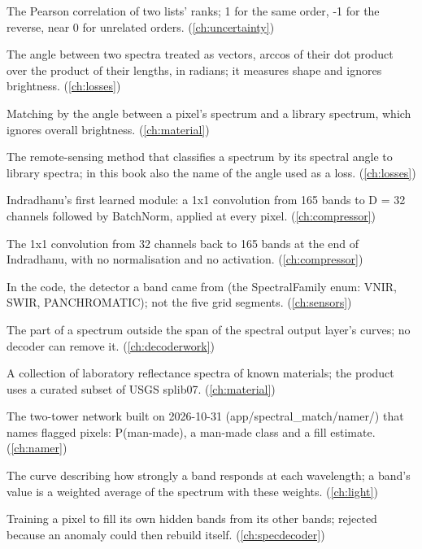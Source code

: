 \begin{description}[style=nextline,leftmargin=1.2em,font=\normalfont\bfseries]
\item[Spearman rank correlation] The Pearson correlation of two lists' ranks; 1 for the same order, -1 for the reverse, near 0 for unrelated orders. (\cref{ch:uncertainty})
\item[Spectral angle] The angle between two spectra treated as vectors, arccos of their dot product over the product of their lengths, in radians; it measures shape and ignores brightness. (\cref{ch:losses})
\item[Spectral angle mapper] Matching by the angle between a pixel's spectrum and a library spectrum, which ignores overall brightness. (\cref{ch:material})
\item[Spectral Angle Mapper (SAM)] The remote-sensing method that classifies a spectrum by its spectral angle to library spectra; in this book also the name of the angle used as a loss. (\cref{ch:losses})
\item[Spectral compressor] Indradhanu's first learned module: a 1x1 convolution from 165 bands to D = 32 channels followed by BatchNorm, applied at every pixel. (\cref{ch:compressor})
\item[Spectral decompressor] The 1x1 convolution from 32 channels back to 165 bands at the end of Indradhanu, with no normalisation and no activation. (\cref{ch:compressor})
\item[Spectral family] In the code, the detector a band came from (the SpectralFamily enum: VNIR, SWIR, PANCHROMATIC); not the five grid segments. (\cref{ch:sensors})
\item[Spectral floor] The part of a spectrum outside the span of the spectral output layer's curves; no decoder can remove it. (\cref{ch:decoderwork})
\item[Spectral library] A collection of laboratory reflectance spectra of known materials; the product uses a curated subset of USGS splib07. (\cref{ch:material})
\item[Spectral namer] The two-tower network built on 2026-10-31 (app/spectral\_match/namer/) that names flagged pixels: P(man-made), a man-made class and a fill estimate. (\cref{ch:namer})
\item[Spectral response function (SRF)] The curve describing how strongly a band responds at each wavelength; a band's value is a weighted average of the spectrum with these weights. (\cref{ch:light})
\item[Spectral self-completion] Training a pixel to fill its own hidden bands from its other bands; rejected because an anomaly could then rebuild itself. (\cref{ch:specdecoder})

\end{description}
